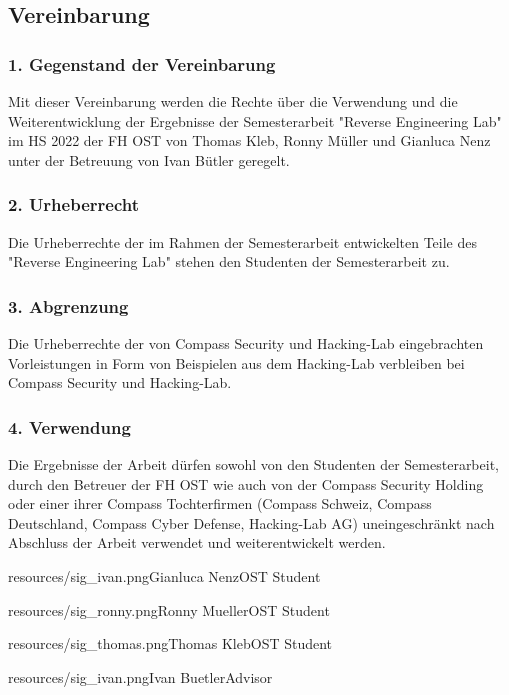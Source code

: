 \subsection*{Vereinbarung}
\subsubsection*{1. Gegenstand der Vereinbarung}
Mit dieser Vereinbarung werden die Rechte über die Verwendung und die Weiterentwicklung der Ergebnisse der Semesterarbeit "Reverse Engineering Lab" im HS 2022 der FH OST von Thomas Kleb, Ronny Müller und Gianluca Nenz unter der Betreuung von Ivan Bütler geregelt. \\

\vspace{-2ex}
\subsubsection*{2. Urheberrecht}
Die Urheberrechte der im Rahmen der Semesterarbeit entwickelten Teile des "Reverse Engineering Lab" stehen den Studenten der Semesterarbeit zu.\\

\vspace{-2ex}
\subsubsection*{3. Abgrenzung}
Die Urheberrechte der von Compass Security und Hacking-Lab eingebrachten Vorleistungen in Form von Beispielen aus dem Hacking-Lab verbleiben bei Compass Security und Hacking-Lab. \\

\vspace{-2ex}
\subsubsection*{4. Verwendung}
Die Ergebnisse der Arbeit dürfen sowohl von den Studenten der Semesterarbeit, durch den Betreuer der FH OST wie auch von der Compass Security Holding oder einer ihrer Compass Tochterfirmen (Compass Schweiz, Compass Deutschland, Compass Cyber Defense, Hacking-Lab AG) uneingeschränkt nach Abschluss der Arbeit verwendet und weiterentwickelt werden. \\

\vspace{-3ex}
\signature{0.75}{resources/sig_ivan.png}{Gianluca Nenz}{OST Student}\hfill\signature{2}{resources/sig_ronny.png}{Ronny Mueller}{OST Student}

\signature{0.2}{resources/sig_thomas.png}{Thomas Kleb}{OST Student}\hfill \signature{0.75}{resources/sig_ivan.png}{Ivan Buetler}{Advisor}

